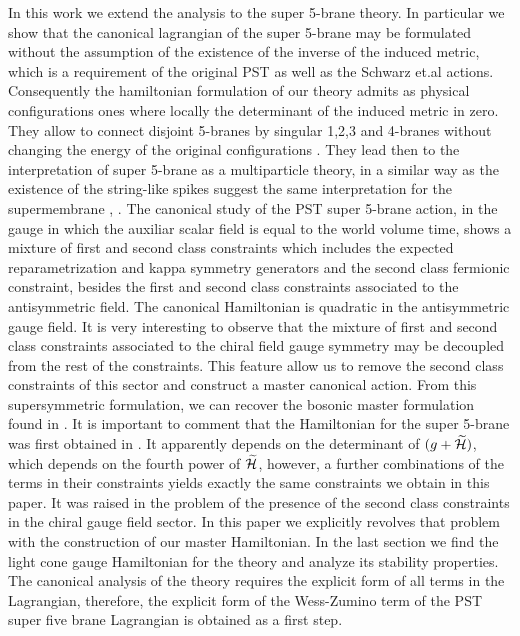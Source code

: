 \documentclass[a4paper,12pt]{article}
\def\CH{\widetilde{\cal{H}}}
\begin{document}
In this work we extend the analysis to the super 5-brane theory.
In particular we show that the canonical lagrangian of the super
5-brane may be formulated without the assumption of the existence
of the inverse of the induced metric, which is a requirement of
the original PST as well as the Schwarz  et.al actions.
Consequently the hamiltonian formulation of our theory admits as
physical configurations ones where locally the determinant of the
induced metric in zero. They allow to connect disjoint 5-branes by
singular 1,2,3 and 4-branes without changing the energy of the
original configurations . They lead then to the interpretation of
super 5-brane as a multiparticle theory, in a similar way as the
existence of the string-like spikes suggest the same
interpretation for the supermembrane \cite{deWit:1989ct},
\cite{Nicolai:1998ic}. The canonical study of the  PST super
5-brane action, in the gauge in which the  auxiliar scalar field
is equal to the world volume time, shows a mixture of first and
second class constraints which includes the expected
reparametrization and kappa symmetry generators and the second
class fermionic constraint, besides the first and second class
constraints associated to the antisymmetric field. The canonical
Hamiltonian is quadratic in the antisymmetric gauge field. It is
very interesting to observe that the mixture of first and second
class constraints associated to the  chiral field gauge symmetry
may be decoupled from the rest of the constraints. This feature
allow us to remove the second class constraints of this sector and
construct a master canonical action. From this supersymmetric
formulation, we can recover the bosonic master formulation found
in \cite{DeCastro:2001gp}. It is important to comment that the
Hamiltonian for the super 5-brane was first obtained in
\cite{Bergshoeff:1998vx} . It apparently depends on the
determinant of $(g+\CH)$, which depends on the fourth power of
$\CH$, however, a further combinations of the terms in their
constraints yields exactly the same constraints we  obtain in this
paper. It was raised in \cite{Bergshoeff:1998vx} the problem of
the presence of the second class constraints in the chiral gauge
field sector. In this paper we explicitly revolves that problem
with the construction of our master Hamiltonian. In the last
section we find the light cone gauge Hamiltonian for the theory
and analyze its stability properties. The canonical analysis of
the theory requires the explicit form of all terms in the
Lagrangian, therefore, the explicit form of the Wess-Zumino term
of the PST \cite{Pasti2} super five brane Lagrangian is obtained
as a first step.
\end{document}

